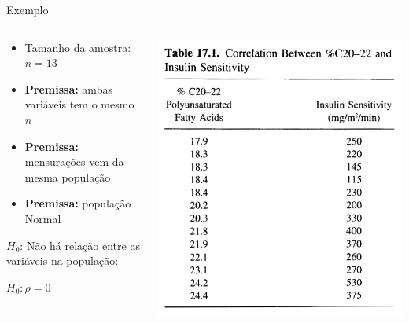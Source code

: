 \documentclass{beamer}
\begin{document}
\begin{frame}{\scriptsize Exemplo}
  \begin{columns}
    \begin{column}{5cm}
      \begin{itemize}
        \footnotesize
      \item Tamanho da amostra: $n=13$
      \bigskip
      \item {\bf Premissa:} ambas variáveis tem o mesmo $n$
      \item {\bf Premissa:} mensurações vem da mesma população
      \item {\bf Premissa:} população Normal
      \end{itemize}
      \bigskip
      \begin{block}{}
        \footnotesize
        $H_0$: Não há relação entre as variáveis na população:

        \medskip
        $H_0: \rho = 0$
      \end{block}
    \end{column}
    \begin{column}{5cm}
      \includegraphics[height=0.8\textheight]{Cap17/table}
    \end{column}
  \end{columns}
\end{frame}
\end{document}
